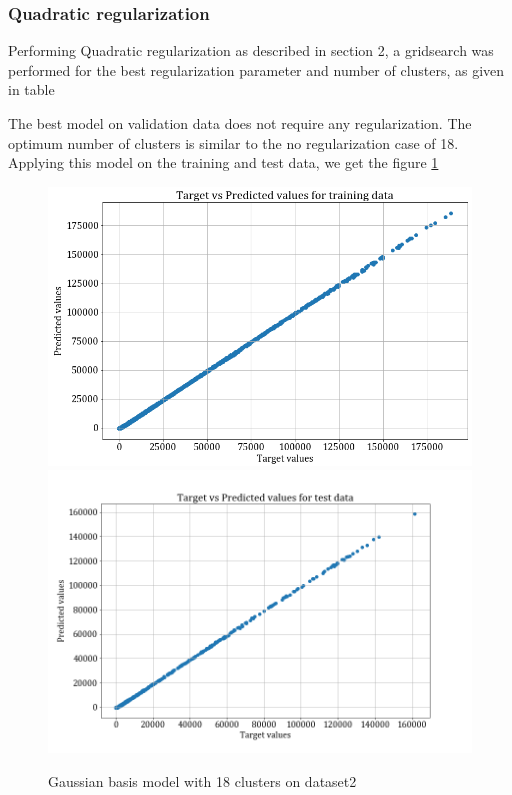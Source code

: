\documentclass[12pt,a4paper]{article}
\begin{document}
\subsubsection{Quadratic regularization}
Performing Quadratic regularization as described in section 2, a gridsearch was performed for the best regularization parameter and number of clusters, as given in table 

The best model on validation data does not require any regularization. The optimum number of clusters is similar to the no regularization case of 18. Applying this model on the training and test data, we get the figure \ref{fig:gaus_ds2_l2}
\begin{figure}
    \centering
    \includegraphics[scale=0.25]{images/train_ds2_L2reg.png}
    \includegraphics[scale=0.25]{images/test_ds2_L2reg.png}
    \caption{Gaussian basis model with 18 clusters on dataset2}
    \label{fig:gaus_ds2_l2}
\end{figure}
\end{document}
